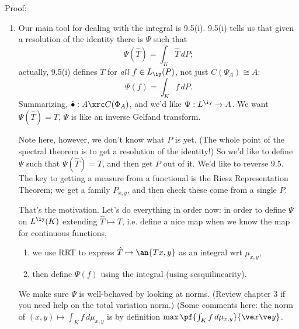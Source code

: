Proof: 
\begin{enumerate}
\item
Our main tool for dealing with the integral is 9.5(i). 9.5(i) tells us that given a resolution of the identity there is $\Psi$ such that
\[
\Psi(\hat T)=\int_K \hat T\,dP;
\]
actually, 9.5(i) defines $T$ for {\it all} $f\in L_{\iy}(P)$, not just $C(\Psi_A)\cong A$:
\[
\Psi(f)=\int_K f\,dP.
\]
Summarizing, $\hat{\bullet}:A\xrc C(\Phi_A)$, and we'd like $\Psi:L^{\iy}\to A$. We want $\Psi(\hat T)=T$, $\Psi$ is like an inverse Gelfand transform. 

Note here, however, we don't know what $P$ is yet. (The whole point of the spectral theorem is to get a resolution of the identity!) So we'd like to define $\Psi$ such that $\Psi(\hat T)=T$, and then get $P$ out of it. We'd like to reverse 9.5. The key to getting a measure from a functional is the Riesz Representation Theorem; we get a family $P_{x,y}$, and then check these come from a single $P$.

That's the motivation. Let's do everything in order now: in order to define $\Psi$ on $L^{\iy}(K)$ extending $\hat T\mapsto T$, i.e. define a nice map when we know the map for continuous functions, 
\begin{enumerate}
\item
we use RRT to express $\hat T\mapsto \an{Tx,y}$ as an integral wrt $\mu_{x,y}$,
\item
then define $\Psi(f)$ using the integral (using sesquilinearity).
\end{enumerate}
 We make sure $\Psi$ is well-behaved by looking at norms. (Review chapter 3 if you need help on the total variation norm.) (Some comments here: the norm of $(x,y)\mapsto \int_K f\,d\mu_{x,y}$ is by definition $\max \pf{\int_K f\,d\mu_{x,y}}{\ve x\ve y}$.


\end{enumerate}
